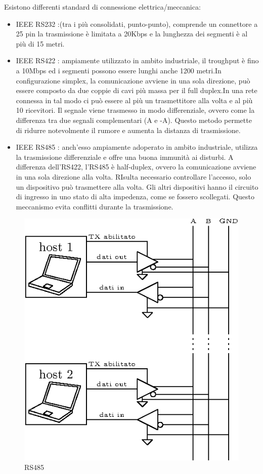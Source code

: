 \documentclass[10pt, letterpaper]{report}
\begin{document}
Esistono differenti standard di connessione elettrica/meccanica:\begin{itemize}
    \item IEEE RS232  :(tra i più consolidati, punto-punto),
     comprende un connettore a 25 pin la trasmissione è limitata a  20Kbps e la lunghezza dei segmenti è al più di 15 metri.
     \item IEEE RS422 : ampiamente utilizzato in ambito industriale, il troughput è fino a 10Mbps ed i segmenti possono essere lunghi anche 1200 metri.In configurazione simplex, la comunicazione avviene in una sola direzione, può essere composto da due coppie di cavi più massa per il full duplex.\acc In una rete connessa in tal modo ci può essere al più un trasmettitore alla volta e al più 10 ricevitori.\acc 
     Il segnale viene trasmesso in modo differenziale, ovvero come la differenza tra due segnali complementari (A e -A). Questo metodo permette di ridurre notevolmente il rumore e aumenta la distanza di trasmissione.
     \item IEEE RS485 : anch'esso ampiamente adoperato in ambito industriale, 
    utilizza la trasmissione differenziale e offre una buona immunità ai disturbi. A differenza dell'RS422, l'RS485 è half-duplex, ovvero la comunicazione avviene in una sola direzione alla volta.\acc 
    RIsulta necessario controllare l'accesso, solo un dispositivo può trasmettere alla volta. Gli altri dispositivi hanno il circuito di ingresso in uno stato di alta impedenza, come se fossero scollegati. Questo meccanismo evita conflitti durante la trasmissione.
\end{itemize}\begin{figure}[h!]
\centering
\includegraphics[width=0.4 \textwidth ]{images/RS485.eps}
    \caption{RS485}
\end{figure}
\end{document}
